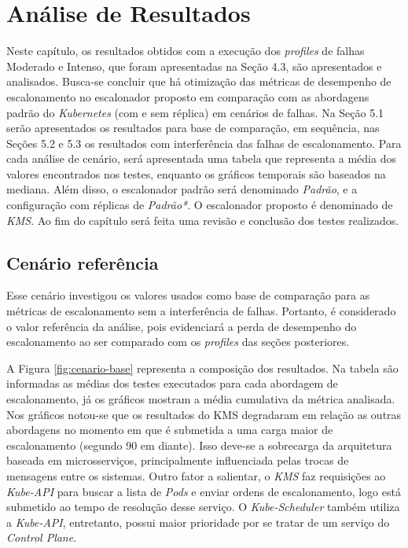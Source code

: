 \chapter{Análise de Resultados}
Neste capítulo, os resultados obtidos com a execução dos \textit{profiles} de falhas Moderado e Intenso, que foram apresentadas na Seção 4.3, são apresentados e analisados. Busca-se concluir que há otimização das métricas de desempenho de escalonamento no escalonador proposto em comparação com as abordagens padrão do \textit{Kubernetes} (com e sem réplica) em cenários de falhas. Na Seção 5.1 serão apresentados os resultados para base de comparação, em sequência, nas Seções 5.2 e 5.3 os resultados com interferência das falhas de escalonamento. Para cada análise de cenário, será apresentada uma tabela que representa a média dos valores encontrados nos testes, enquanto os gráficos temporais são baseados na mediana. Além disso, o escalonador padrão será denominado \textit{Padrão}, e a configuração com réplicas de \textit{Padrão*}. O escalonador proposto é denominado de \textit{KMS}. Ao fim do capítulo será feita uma revisão e conclusão dos testes realizados.

\section{Cenário referência}

Esse cenário investigou os valores usados como base de comparação para as métricas de escalonamento sem a interferência de falhas. Portanto, é considerado o valor referência da análise, pois evidenciará a perda de desempenho do escalonamento ao ser comparado com os \textit{profiles} das seções posteriores.

A Figura \ref{fig:cenario-base} representa a composição dos resultados. Na tabela são informadas as médias dos testes executados para cada abordagem de escalonamento, já os gráficos mostram a média cumulativa da métrica analisada. Nos gráficos notou-se que os resultados do \ac{KMS} degradaram em relação as outras abordagens no momento em que é submetida a uma carga maior de escalonamento (segundo 90 em diante). Isso deve-se a sobrecarga da arquitetura baseada em microsserviços, principalmente influenciada pelas trocas de mensagens entre os sistemas. Outro fator a salientar, o \textit{KMS} faz requisições ao \textit{Kube-API} para buscar a lista de \textit{Pods} e enviar ordens de escalonamento, logo está submetido ao tempo de resolução desse serviço. O \textit{Kube-Scheduler} também utiliza a \textit{Kube-API}, entretanto, possui maior prioridade por se tratar de um serviço do \textit{Control Plane}.

